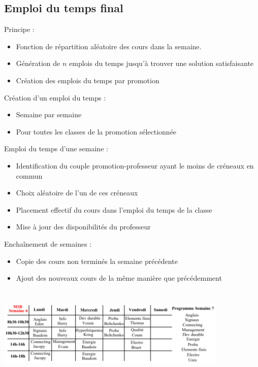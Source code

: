 \documentclass{beamer}
\begin{document}
\subsection{Emploi du temps final}

\begin{frame}
Principe :
\begin{itemize}
\item Fonction de répartition aléatoire des cours dans la semaine.\\
\item Génération de $n$ emplois du temps jusqu'à trouver une solution satisfaisante\\ 
\item Création des emplois du temps par promotion
\end{itemize}
\end{frame}

\begin{frame}
Création d'un emploi du temps :\\
\begin{itemize}
\item Semaine par semaine
\item Pour toutes les classes de la promotion sélectionnée
\end{itemize}
\end{frame}

\begin{frame}
Emploi du temps d'une semaine :
\begin{itemize}
\item Identification du couple promotion-professeur ayant le moins de créneaux en commun
\item Choix aléatoire de l'un de ces créneaux
\item Placement effectif du cours dans l'emploi du temps de la classe
\item Mise à jour des disponibilités du professeur
\end{itemize}
\end{frame}

\begin{frame}
Enchaînement de semaines :
\begin{itemize}
\item Copie des cours non terminés la semaine précédente
\item Ajout des nouveaux cours de la même manière que précédemment
\end{itemize}
\end{frame}

\begin{frame}
\begin{center}
\includegraphics [width=110mm, height=45mm]{Dessin3.png}
\end{center}
\end{frame}
\end{document}
